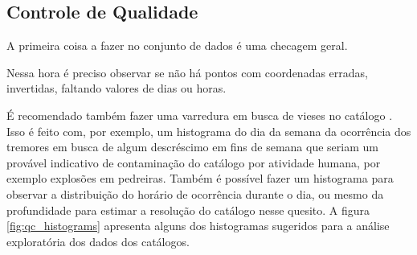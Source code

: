 \subsection{Controle de Qualidade}
\label{sec:qualicontrol}

A primeira coisa a fazer no conjunto de dados é uma checagem geral.

Nessa hora é preciso observar se não há pontos com coordenadas erradas, invertidas, faltando valores de dias ou horas.

É recomendado também fazer uma varredura em busca de vieses no catálogo \citep{van_stiphout_2010}.
Isso é feito com, por exemplo, um histograma do dia da semana da ocorrência dos tremores em busca
de algum descréscimo em fins de semana que seriam um provável indicativo de contaminação do catálogo 
por atividade humana, por exemplo explosões em pedreiras. 
Também é possível fazer um histograma para observar a
distribuição do horário de ocorrência durante o dia, 
ou mesmo da profundidade para estimar a resolução do catálogo
nesse quesito. A figura \ref{fig:qc_histograms} apresenta alguns dos histogramas sugeridos para a análise
exploratória dos dados dos catálogos.

